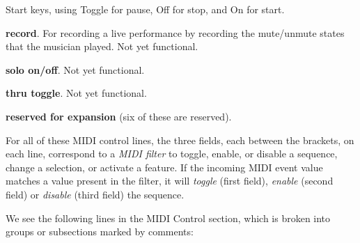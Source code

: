 \begin{enumber}
\begin{enumber}
               Start keys, using Toggle for pause, Off for stop, and On for
               start.
            \item \textbf{record}.  For recording a live performance by
               recording the mute/unmute states that the musician played.
               Not yet functional.
            \item \textbf{solo on/off}.
               Not yet functional.
            \item \textbf{thru toggle}.
               Not yet functional.
            \item \textbf{reserved for expansion} (six of these are reserved).
         \end{enumber}
   \end{enumber}

   For all of these MIDI control lines,
   the three fields, each between the brackets, on each line, correspond to a
   \textsl{MIDI filter} to toggle, enable, or disable a sequence, change a
   selection, or activate a feature.
   If the incoming MIDI event value matches a value present in the filter, it
   will \textsl{toggle} (first field), \textsl{enable} (second field) or
   \textsl{disable} (third field) the sequence.

   We see the following lines in the MIDI Control section, which is broken
   into groups or subsections marked by comments:

